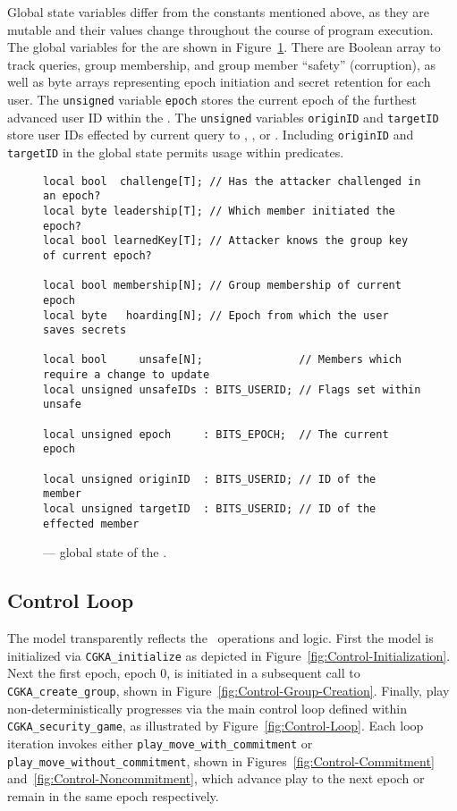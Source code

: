 Global state variables differ from the constants mentioned above, as they are mutable and their values change throughout the course of program execution.
The global variables for the  are shown in Figure\ \ref{fig:Global-State}.
There are Boolean array to track  queries, group membership, and group member ``safety'' (corruption), as well as byte arrays representing epoch initiation and secret retention for each user.
The \texttt{unsigned} variable \texttt{epoch} stores the current epoch of the furthest advanced user ID within the \CGKAsec.
The \texttt{unsigned} variables \texttt{originID} and \texttt{targetID} store user IDs effected by current query to , , or .
Including \texttt{originID} and \texttt{targetID} in the global state permits usage within  predicates.


\begin{figure}[ht!]
  \centering
  \caption{\label{fig:Global-State}\CGKAmod{}{}{} --- global state of the \CGKAsec.}
\begin{verbatim}
local bool  challenge[T]; // Has the attacker challenged in an epoch?
local byte leadership[T]; // Which member initiated the epoch?
local bool learnedKey[T]; // Attacker knows the group key of current epoch?

local bool membership[N]; // Group membership of current epoch
local byte   hoarding[N]; // Epoch from which the user saves secrets

local bool     unsafe[N];               // Members which require a change to update
local unsigned unsafeIDs : BITS_USERID; // Flags set within unsafe

local unsigned epoch     : BITS_EPOCH;  // The current epoch

local unsigned originID  : BITS_USERID; // ID of the  member
local unsigned targetID  : BITS_USERID; // ID of the effected member
\end{verbatim}
\end{figure}


\hypertarget{subsec:control-loop}{%
\subsection{Control Loop}\label{subsec:control-loop}}

The  model transparently reflects the \CGKAsec\ operations and logic.
First the  model is initialized via \texttt{CGKA\_initialize} as depicted in Figure\ \ref{fig:Control-Initialization}.
Next the first epoch, epoch \(0\), is initiated in a subsequent call to \texttt{CGKA\_create\_group}, shown in Figure\ \ref{fig:Control-Group-Creation}.
Finally, play non-deterministically progresses via the main control loop defined within \texttt{CGKA\_security\_game}, as illustrated by Figure\ \ref{fig:Control-Loop}.
Each loop iteration invokes either \texttt{play\_move\_with\_commitment} or \texttt{play\_move\_without\_commitment}, shown in Figures\ \ref{fig:Control-Commitment} and\ \ref{fig:Control-Noncommitment}, which advance play to the next epoch or remain in the same epoch respectively.

